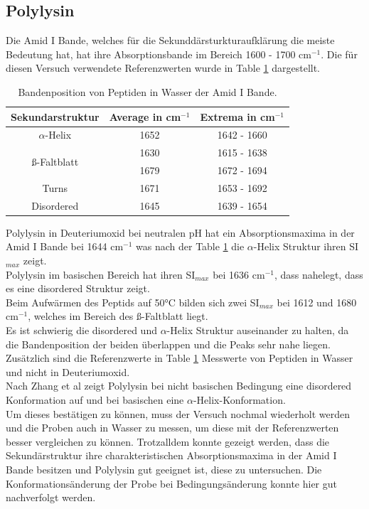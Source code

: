 \documentclass[10pt,a4paper]{article}
\begin{document}
			\subsection{Polylysin}
				Die Amid I Bande, welches für die Sekunddärsturkturaufklärung die meiste Bedeutung hat, hat ihre Absorptionsbande im Bereich 1600 - 1700 cm$^{-1}$.
				Die für diesen Versuch verwendete Referenzwerten wurde in Table \ref{tab:ref_values_sec_stru} dargestellt.
					\begin{table}[H]
						\centering
						\caption{Bandenposition von Peptiden in Wasser der Amid I Bande\cite{Script}.}
						\label{tab:ref_values_sec_stru}
						\begin{tabular}{ccc}
							\toprule
							Sekundarstruktur & Average in  cm$^{-1}$& Extrema in cm$^{-1}$\\
							\midrule
							$\alpha$-Helix & 1652 & 1642 - 1660\\
							\midrule
							\multirow{2}{*}{ß-Faltblatt } & 1630 & 1615 - 1638\\
							& 1679 & 1672 - 1694\\
							\midrule
							Turns & 1671 & 1653 - 1692 \\
							\midrule
							Disordered & 1645 & 1639 - 1654\\
							\bottomrule
						\end{tabular}
					\end{table}				
						
			Polylysin in Deuteriumoxid bei neutralen pH hat ein Absorptionsmaxima in der Amid I Bande bei 1644 cm$^{-1}$ was nach der Table \ref{tab:ref_values_sec_stru} die $\alpha$-Helix Struktur ihren SI$_{max}$ zeigt.\\
			Polylysin im basischen Bereich hat ihren SI$_{max}$  bei 1636 cm$^{-1}$, dass nahelegt, dass es eine disordered Struktur zeigt.\\
			Beim Aufwärmen des Peptids auf 50°C bilden sich zwei SI$_{max}$  bei 1612 und 1680 cm$^{-1}$, welches im Bereich des ß-Faltblatt liegt.\\
			Es ist schwierig die disordered und $\alpha$-Helix Struktur auseinander zu halten, da die Bandenposition der beiden überlappen und die Peaks sehr nahe liegen. Zusätzlich sind die Referenzwerte in Table \ref{tab:ref_values_sec_stru} Messwerte von Peptiden in Wasser und nicht in  Deuteriumoxid.\\
			Nach Zhang et al\cite{Polylysin} zeigt Polylysin bei nicht basischen Bedingung eine disordered Konformation auf und bei basischen eine $\alpha$-Helix-Konformation.\\
			Um dieses bestätigen zu können, muss der Versuch nochmal wiederholt werden und die Proben auch in Wasser zu messen, um diese mit der Referenzwerten besser vergleichen zu können.
			Trotzalldem konnte gezeigt werden, dass die Sekundärstruktur ihre charakteristischen Absorptionsmaxima in der Amid I Bande besitzen und Polylysin gut geeignet ist, diese zu untersuchen.
			Die Konformationsänderung der Probe bei Bedingungsänderung konnte hier gut nachverfolgt werden.
\end{document}
